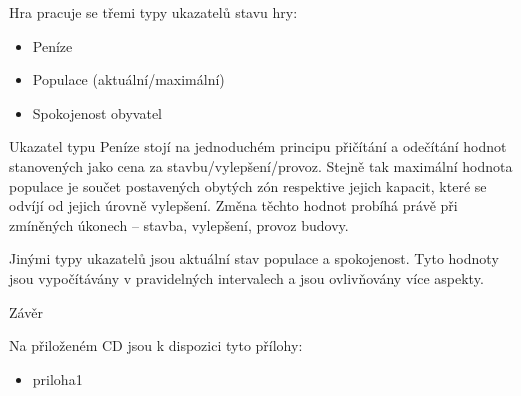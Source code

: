 \documentclass[twoside,12pt]{article}
\begin{document}
 
 Hra pracuje se třemi typy ukazatelů stavu hry:
  
 \begin{itemize}
\item Peníze
\item Populace (aktuální/maximální)
\item Spokojenost obyvatel
\end{itemize}
 
 Ukazatel typu Peníze stojí na jednoduchém principu přičítání a odečítání hodnot stanovených jako cena za stavbu/vylepšení/provoz. Stejně tak maximální hodnota populace je součet postavených obytých zón respektive jejich kapacit, které se odvíjí od jejich úrovně vylepšení. Změna těchto hodnot probíhá právě při zmíněných úkonech -- stavba, vylepšení, provoz budovy.
 
 Jinými typy ukazatelů jsou aktuální stav populace a spokojenost. Tyto hodnoty jsou vypočítávány v pravidelných intervalech a jsou ovlivňovány více aspekty.
 
% 
\newpage

%
%
Závěr

%

%
%
Na přiloženém CD jsou k dispozici tyto přílohy: 
\begin{itemize}
\item priloha1
\end{itemize}
\end{document}
